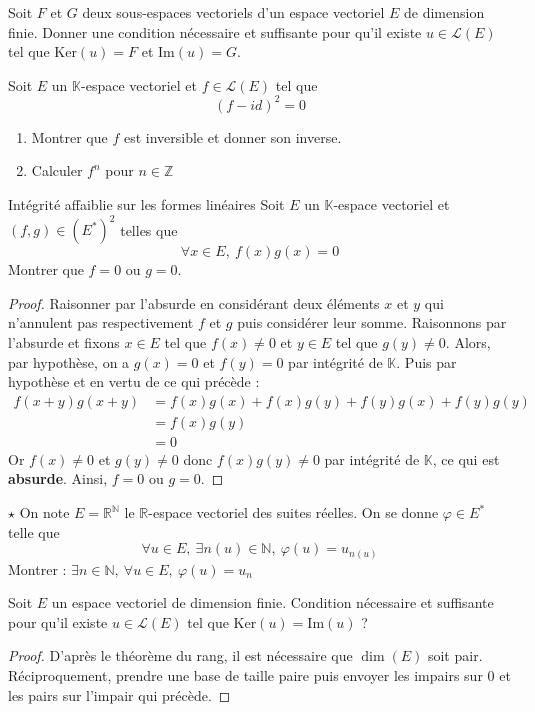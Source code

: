 \documentclass[french,a4paper]{article}
\newcommand{\N}{\mathbb{N}}
\newcommand{\Z}{\mathbb{Z}}
\newcommand{\R}{\mathbb{R}}
\newcommand{\K}{\mathbb{K}}
\newcommand{\st}{^*}
\renewcommand{\ker}{\text{Ker}}
\newcommand{\im}{\text{Im}}
\theoremstyle{plain}
\theoremstyle{definition}
\theoremstyle{remark}
\begin{document}
\begin{ex}[Moulin.EV.32]{}
	Soit $F$ et $G$ deux sous-espaces vectoriels d'un espace vectoriel $E$ de dimension finie. Donner une condition nécessaire et suffisante pour qu'il existe $u\in\mathcal{L}(E)$ tel que $\ker(u)=F$ et $\text{Im}(u)=G$.
\end{ex}

\begin{ex}[Morlot]{}
	Soit $E$ un $\K$-espace vectoriel et $f\in\mathcal{L}(E)$ tel que $$(f-id)^2=0$$ 
	\begin{enumerate}
		\item Montrer que $f$ est inversible et donner son inverse.
		\item Calculer $f^n$ pour $n \in \Z$
	\end{enumerate}
\end{ex}

\begin{ex}[Morlot]{Intégrité affaiblie sur les formes linéaires}
	Soit $E$ un $\K$-espace vectoriel et $(f,g) \in (E\st)^2$ telles que $$\forall x \in E, \ f(x)g(x)=0$$ Montrer que $f=0$ ou $g=0$.
\end{ex}
\begin{proof}
	Raisonner par l'absurde en considérant deux éléments $x$ et $y$ qui n'annulent pas respectivement $f$ et $g$ puis considérer leur somme. Raisonnons par l'absurde et fixons $x \in E$ tel que $f(x)\ne0$ et $y \in E$ tel que $g(y)\ne0$. Alors, par hypothèse, on a $g(x)=0$ et $f(y)=0$ par intégrité de $\K$. Puis par hypothèse et en vertu de ce qui précède :
	\begin{align*}
		f(x+y)g(x+y) & = f(x)g(x)+f(x)g(y)+f(y)g(x)+f(y)g(y) \\
		& =f(x)g(y) \\
		& = 0
	\end{align*}
	Or $f(x)\ne0$ et $g(y)\ne0$ donc $f(x)g(y)\ne0$ par intégrité de $\K$, ce qui est \textbf{absurde}. Ainsi, $f=0$ ou $g=0$.
\end{proof}

\begin{ex}[Morlot]{$\star$}
	On note $E=\R^\N$ le $\R$-espace vectoriel des suites réelles. On se donne $\varphi\in E\st$ telle que $$\forall u\in E,\ \exists n(u)\in \N,\ \varphi(u)=u_{n(u)}$$ Montrer : $\exists n\in\N,\ \forall u\in E,\ \varphi(u)=u_n$
\end{ex}

\begin{ex}[Moulin.EV.33]{}
	Soit $E$ un espace vectoriel de dimension finie. Condition nécessaire et suffisante pour qu'il existe $u\in\mathcal{L}(E)$ tel que $\ker(u)=\im(u)$ ?
\end{ex}
\begin{proof}
	D'après le théorème du rang, il est nécessaire que $\dim(E)$ soit pair. Réciproquement, prendre une base de taille paire puis envoyer les impairs sur $0$ et les pairs sur l'impair qui précède.
\end{proof}
\end{document}
